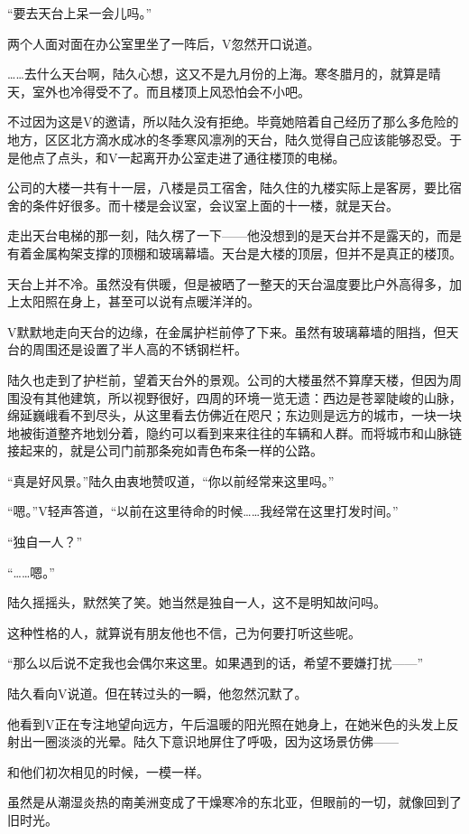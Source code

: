 “要去天台上呆一会儿吗。”

两个人面对面在办公室里坐了一阵后，V忽然开口说道。

……去什么天台啊，陆久心想，这又不是九月份的上海。寒冬腊月的，就算是晴天，室外也冷得受不了。而且楼顶上风恐怕会不小吧。

不过因为这是V的邀请，所以陆久没有拒绝。毕竟她陪着自己经历了那么多危险的地方，区区北方滴水成冰的冬季寒风凛冽的天台，陆久觉得自己应该能够忍受。于是他点了点头，和V一起离开办公室走进了通往楼顶的电梯。

公司的大楼一共有十一层，八楼是员工宿舍，陆久住的九楼实际上是客房，要比宿舍的条件好很多。而十楼是会议室，会议室上面的十一楼，就是天台。

走出天台电梯的那一刻，陆久楞了一下——他没想到的是天台并不是露天的，而是有着金属构架支撑的顶棚和玻璃幕墙。天台是大楼的顶层，但并不是真正的楼顶。

天台上并不冷。虽然没有供暖，但是被晒了一整天的天台温度要比户外高得多，加上太阳照在身上，甚至可以说有点暖洋洋的。

V默默地走向天台的边缘，在金属护栏前停了下来。虽然有玻璃幕墙的阻挡，但天台的周围还是设置了半人高的不锈钢栏杆。

陆久也走到了护栏前，望着天台外的景观。公司的大楼虽然不算摩天楼，但因为周围没有其他建筑，所以视野很好，四周的环境一览无遗：西边是苍翠陡峻的山脉，绵延巍峨看不到尽头，从这里看去仿佛近在咫尺；东边则是远方的城市，一块一块地被街道整齐地划分着，隐约可以看到来来往往的车辆和人群。而将城市和山脉链接起来的，就是公司门前那条宛如青色布条一样的公路。

“真是好风景。”陆久由衷地赞叹道，“你以前经常来这里吗。”

“嗯。”V轻声答道，“以前在这里待命的时候……我经常在这里打发时间。”

“独自一人？”

“……嗯。”

陆久摇摇头，默然笑了笑。她当然是独自一人，这不是明知故问吗。

这种性格的人，就算说有朋友他也不信，己为何要打听这些呢。

“那么以后说不定我也会偶尔来这里。如果遇到的话，希望不要嫌打扰——”

陆久看向V说道。但在转过头的一瞬，他忽然沉默了。

他看到V正在专注地望向远方，午后温暖的阳光照在她身上，在她米色的头发上反射出一圈淡淡的光晕。陆久下意识地屏住了呼吸，因为这场景仿佛——

和他们初次相见的时候，一模一样。

虽然是从潮湿炎热的南美洲变成了干燥寒冷的东北亚，但眼前的一切，就像回到了旧时光。

